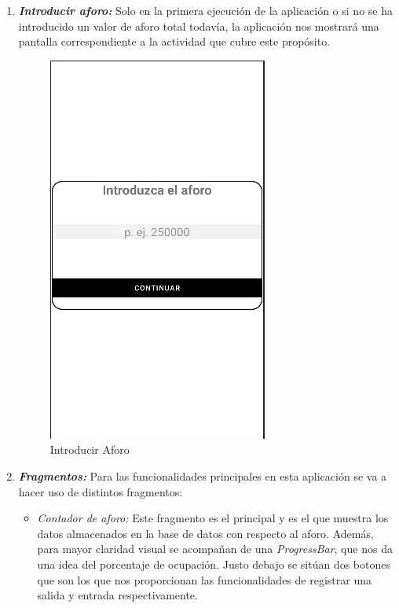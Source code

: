 \documentclass[a4paper,openright,12pt]{article}
\begin{document}
\begin{itemize}
\begin{enumerate}
   
\item\textbf{\textit{Introducir aforo:}} Solo en la primera ejecución de la aplicación o si no se ha introducido un valor de aforo total todavía, la aplicación nos mostrará una pantalla correspondiente a la actividad que cubre este propósito.
\begin{figure}[H]
     \centering
    \includegraphics[scale=0.7]{Introducir.PNG}
     \caption{Introducir Aforo}
    \label{fig:my_label}
\end{figure}
\item\textbf{\textit{Fragmentos:}} Para las funcionalidades principales en esta aplicación se va a hacer uso de distintos fragmentos:
\begin{itemize}
\item\textit{Contador de aforo:} Este fragmento es el principal y es el que muestra los datos almacenados en la base de datos con respecto al aforo. Además, para mayor claridad visual se acompañan de una \textit{ProgressBar}, que nos da una idea del porcentaje de ocupación. Justo debajo se sitúan dos botones que son los que nos proporcionan las funcionalidades de registrar una salida y entrada respectivamente.
\begin{figure}[H]
     \centering

\end{figure}
\end{itemize}
\end{enumerate}
\end{itemize}
\end{document}
